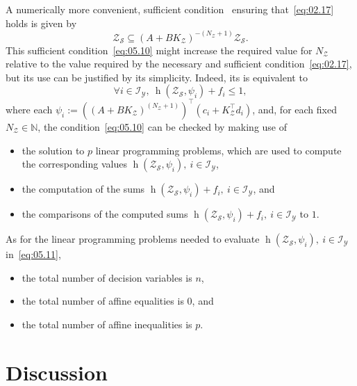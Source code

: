 \documentclass[twocolumn]{autart}
\newcommand{\mb}[1]{\mathbb{#1}}
\newcommand{\mc}[1]{\mathcal{#1}}
\newcommand{\N}{\mb{N}}
\newcommand{\support}[2]{\operatorname{h}(#1,#2)}
\numberwithin{equation}{section}
\begin{document}
A  numerically more convenient, sufficient condition~\cite{rakovic:zhang:2023:a} ensuring that~\eqref{eq:02.17} holds is given by
\begin{equation}
\label{eq:05.10}
\mc{Z}_\mc{S}\subseteq (A+BK_\mc{Z})^{-(N_\mc{Z}+1)}\mc{Z}_\mc{S}.
\end{equation}
This sufficient condition~\eqref{eq:05.10} might increase the required value for $N_\mc{Z}$ relative to the value required by the necessary and sufficient condition~\eqref{eq:02.17}, but its use can be  justified by its simplicity. Indeed, its is equivalent to
\begin{equation}
\label{eq:05.11}
\forall i\in\mc{I}_\mc{Y},\  \support{\mc{Z}_\mc{S}}{\psi_i}+f_i\le 1,
\end{equation}
where each $\psi_i:=((A+BK_\mc{Z})^{(N_\mc{Z}+1)})^\top (c_i + K_\mc{Z}^\top d_i)$, and, for each fixed $N_\mc{Z}\in\N$,  the condition~\eqref{eq:05.10} can be checked by making use of 
\begin{itemize}
\item the solution to $p$ linear programming problems,  which are used to compute the corresponding values $\support{\mc{Z}_\mc{S}}{\psi_i},\ i\in\mc{I}_\mc{Y}$,
\item  the computation of the sums $\support{\mc{Z}_\mc{S}}{\psi_i}+f_i,\ i\in\mc{I}_\mc{Y}$, and
\item  the comparisons of the computed sums $\support{\mc{Z}_\mc{S}}{\psi_i}+f_i,\ i\in\mc{I}_\mc{Y}$ to $1$.
\end{itemize}
As for the linear programming problems needed to evaluate $\support{\mc{Z}_\mc{S}}{\psi_i},\ i\in\mc{I}_\mc{Y}$ in~\eqref{eq:05.11},
\begin{itemize}
\item the total number of decision variables is $n$,
\item the total number of affine equalities is $0$, and 
\item the total number of affine inequalities is $p$.
\end{itemize}



\section{Discussion}
\label{sec:06}

\end{document}

